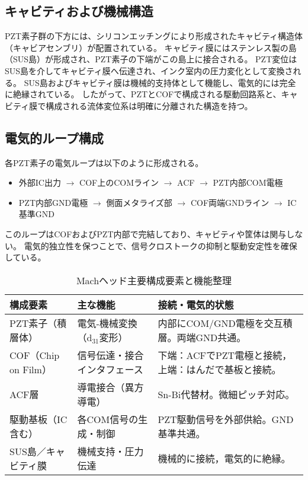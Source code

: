 \documentclass[conference]{IEEEtran}
\begin{document}
\subsection{キャビティおよび機械構造}
PZT素子群の下方には、シリコンエッチングにより形成されたキャビティ構造体（キャビアセンブリ）が配置されている。  
キャビティ膜にはステンレス製の島（SUS島）が形成され、PZT素子の下端がこの島上に接合される。  
PZT変位はSUS島を介してキャビティ膜へ伝達され、インク室内の圧力変化として変換される。  
SUS島およびキャビティ膜は機械的支持体として機能し、電気的には完全に絶縁されている。  
したがって、PZTとCOFで構成される駆動回路系と、キャビティ膜で構成される流体変位系は明確に分離された構造を持つ。

\subsection{電気的ループ構成}
各PZT素子の電気ループは以下のように形成される。  
\begin{itemize}
  \item 外部IC出力 $\rightarrow$ COF上のCOMライン $\rightarrow$ ACF $\rightarrow$ PZT内部COM電極
  \item PZT内部GND電極 $\rightarrow$ 側面メタライズ部 $\rightarrow$ COF両端GNDライン $\rightarrow$ IC基準GND
\end{itemize}
このループはCOFおよびPZT内部で完結しており、キャビティや筐体は関与しない。  
電気的独立性を保つことで、信号クロストークの抑制と駆動安定性を確保している。

\begin{table}[t]
\centering
\footnotesize
\caption{Machヘッド主要構成要素と機能整理}
\label{tab:mach-structure}
\renewcommand{\arraystretch}{1.1}
\begin{tabularx}{\columnwidth}{@{}p{2.2cm} Y Y@{}}
\toprule
構成要素 & 主な機能 & 接続・電気的状態 \\
\midrule
PZT素子（積層体） & 電気-機械変換（d$_{31}$変形） & 内部にCOM/GND電極を交互積層。両端GND共通。 \\
COF（Chip on Film） & 信号伝達・接合インタフェース & 下端：ACFでPZT電極と接続，上端：はんだで基板と接続。 \\
ACF層 & 導電接合（異方導電） & Sn-Bi代替材。微細ピッチ対応。 \\
駆動基板（IC含む） & 各COM信号の生成・制御 & PZT駆動信号を外部供給。GND基準共通。 \\
SUS島／キャビティ膜 & 機械支持・圧力伝達 & 機械的に接続，電気的に絶縁。 \\
\bottomrule
\end{tabularx}
\end{table}
\end{document}
